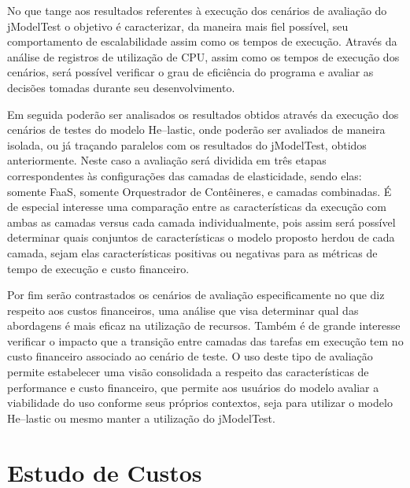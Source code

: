 \documentclass[english,brazilian]{UNISINOSmonografia} %
\begin{document}
No que tange aos resultados referentes à execução dos cenários de avaliação do jModelTest o objetivo é caracterizar, da maneira mais fiel possível, seu comportamento de escalabilidade assim como os tempos de execução.
%
Através da análise de registros de utilização de CPU, assim como os tempos de execução dos cenários, será possível verificar o grau de eficiência do programa e avaliar as decisões tomadas durante seu desenvolvimento.



Em seguida poderão ser analisados os resultados obtidos através da execução dos cenários de testes do modelo \textsf{He}--lastic, onde poderão ser avaliados de maneira isolada, ou já traçando paralelos com os resultados do jModelTest, obtidos anteriormente.
%
Neste caso a avaliação será dividida em três etapas correspondentes às configurações das camadas de elasticidade, sendo elas: somente FaaS, somente Orquestrador de Contêineres, e camadas combinadas.
%
É de especial interesse uma comparação entre as características da execução com ambas as camadas versus cada camada individualmente, pois assim será possível determinar quais conjuntos de características o modelo proposto herdou de cada camada, sejam elas características positivas ou negativas para as métricas de tempo de execução e custo financeiro.



Por fim serão contrastados os cenários de avaliação especificamente no que diz respeito aos custos financeiros, uma análise que visa determinar qual das abordagens é mais eficaz na utilização de recursos.
%
Também é de grande interesse verificar o impacto que a transição entre camadas das tarefas em execução tem no custo financeiro associado ao cenário de teste.
%
O uso deste tipo de avaliação permite estabelecer uma visão consolidada a respeito das características de performance e custo financeiro, que permite aos usuários do modelo avaliar a viabilidade do uso conforme seus próprios contextos, seja para utilizar o modelo \textsf{He}--lastic ou mesmo manter a utilização do jModelTest.





\section{Estudo de Custos}
\label{sec:modelo-custben}


\end{document}
